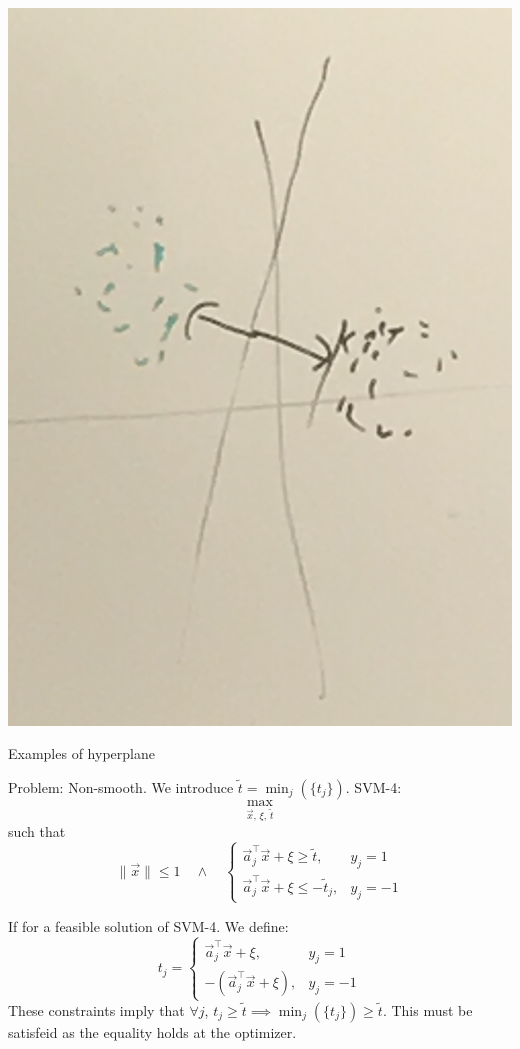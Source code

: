 \documentclass{article}
\begin{document}
\begin{center}
    \includegraphics*[scale=0.13]{hyperplane.JPG}

    \small Examples of hyperplane
\end{center}


Problem: Non-smooth. We introduce  $\widetilde{t} = \min_j(\{t_j\})$. SVM-4:
\[
    \max_{\vec{x},\, \xi,\, \widetilde{t}}
\]
such that
\[
    \|\vec{x}\| \leq 1 \quad \wedge \quad \begin{cases}
        \vec{a}_j^\top \vec{x} + \xi \geq \widetilde{t}, & y_j = 1 \\
        \vec{a}_j^\top \vec{x} + \xi \leq -\widetilde{t}_j, & y_j = -1
    \end{cases}
\]

If for a feasible solution of SVM-4. We define:
\[
    t_j =  \begin{cases}
        \vec{a}_j^\top \vec{x} + \xi, & y_j = 1 \\
        -\left(\vec{a}_j^\top \vec{x} + \xi\right), & y_j = -1
    \end{cases}
\]
These constraints imply that $\forall j$, $t_j \geq \widetilde{t} \implies \min_j(\{t_j\}) \geq \widetilde{t}$. This must be satisfeid as the equality holds at the optimizer.
\end{document}
